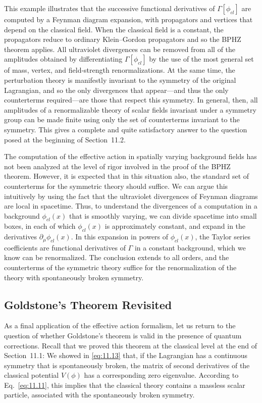 This example illustrates that the successive functional derivatives of
$\Gamma[\phi_{cl}]$ are computed by a Feynman diagram expansion, with
propagators and vertices that depend on the classical field.  When the
classical field is a constant, the propagators reduce to ordinary
Klein--Gordon propagators and so the BPHZ theorem applies.  All ultraviolet
divergences can be removed from all of the amplitudes obtained by
differentiating $\Gamma[\phi_{cl}]$ by the use of the most general set of
mass, vertex, and field-strength renormalizations.  At the same time, the
perturbation theory is manifestly invariant to the symmetry of the original
Lagrangian, and so the only divergences that appear---and thus the only
counterterms required---are those that respect this symmetry.  In general,
then, all amplitudes of a renormalizable theory of scalar fields invariant
under a symmetry group can be made finite using only the set of counterterms
invariant to the symmetry.  This gives a complete and quite satisfactory
answer to the question posed at the beginning of Section~11.2.

The computation of the effective action in spatially varying background
fields has not been analyzed at the level of rigor involved in the proof of
the BPHZ theorem.  However, it is expected that in this situation also, the
standard set of counterterms for the symmetric theory should suffice.  We can
argue this intuitively by using the fact that the ultraviolet divergences of
Feynman diagrams are local in spacetime.  Thus, to understand the divergences
of a computation in a background $\phi_{cl}(x)$ that is smoothly varying, we
can divide spacetime into small boxes, in each of which $\phi_{cl}(x)$ is
approximately constant, and expand in the derivatives
$\partial_\mu\phi_{cl}(x)$.  In this expansion in powers of $\phi_{cl}(x)$, the
Taylor series coefficients are functional derivatives of $\Gamma$ in a
constant background, which we know can be renormalized.  The conclusion
extends to all orders, and the counterterms of the symmetric theory suffice
for the renormalization of the theory with spontaneously broken symmetry.

\subsection{Goldstone's Theorem Revisited}

As a final application of the effective action formalism, let us return to the
question of whether Goldstone's theorem is valid in the presence of quantum
corrections.  Recall that we proved this theorem at the classical level at the
end of Section~11.1: We showed in \eqref{eq:11.13} that, if the Lagrangian has
a continuous symmetry that is spontaneously broken, the matrix of second
derivatives of the classical potential $V(\phi)$ has a corresponding zero
eigenvalue.  According to Eq.~\eqref{eq:11.11}, this implies that the
classical theory contains a massless scalar particle, associated with the
spontaneously broken symmetry.

